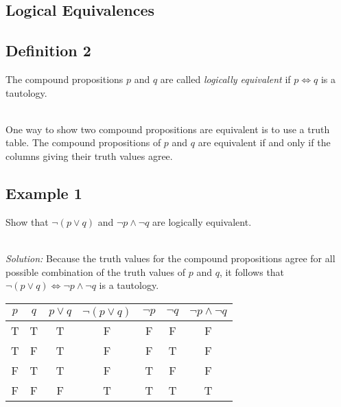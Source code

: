 \documentclass{article}
\begin{document}
\subsection{Logical Equivalences}
\subsection*{Definition 2}
The compound propositions $p$ and $q$ are called \textit{logically equivalent} if $p \Leftrightarrow q$ is a tautology.

\noindent \\ One way to show two compound propositions are equivalent is to use a truth table. The compound propositions of
$p$ and $q$ are equivalent if and only if the columns giving their truth values agree.

\subsection*{Example 1}
Show that $\neg (p \vee q)$ and $\neg p \wedge \neg q$ are logically equivalent.

\noindent \\ \textit{Solution:} Because the truth values for the compound propositions agree for all possible
combination of the truth values of $p$ and $q$, it follows that $\neg (p \vee q) \Leftrightarrow \neg p \wedge \neg q$
is a tautology.

\begin{center}
	\begin{tabular}{|c|c|c|c|c|c|c|}
		\hline
		$p$ & $q$ & $p \vee q$ & $\neg(p \vee q)$ & $\neg p$ & $\neg q$ & $\neg p \wedge \neg q$ \\
		\hline
		T   & T   & T          & F                & F        & F        & F                      \\
		T   & F   & T          & F                & F        & T        & F                      \\
		F   & T   & T          & F                & T        & F        & F                      \\
		F   & F   & F          & T                & T        & T        & T                      \\
		\hline
	\end{tabular}
\end{center}
\end{document}
